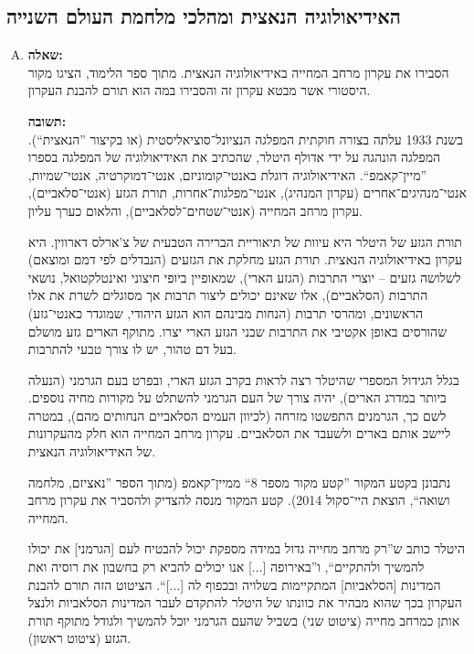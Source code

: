 \documentclass[a4paper]{article}
\newcommand\hl[1]   {#1}
\begin{document}
	\subsection{האידיאולוגיה הנאצית ומהלכי מלחמת העולם השנייה}
		\begin{enumerate}[A.]
			\item \textbf{שאלה: }\\
			הסבירו את עקרון מרחב המחייה באידיאולוגיה הנאצית. מתוך ספר הלימוד, הציגו מקור היסטורי אשר מבטא עקרון זה והסבירו במה הוא תורם להבנת העקרון. 
			
			\textbf{תשובה: }\\			
			בשנת 1933 עלתה בצורה חוקתית המפלגה הנציונל־סוציאליסטית (או בקיצור ''\hl{הנאצית}``). המפלגה הונהגה על ידי \hl{אדולף היטלר}, שהכתיב את האידיאולוגיה של המפלגה בספרו ''מיין־קאמפ``. האידיאולוגיה דוגלת באנטי־קומוניזם, אנטי־דמוקרטיה, אנטי־שמיות, אנטי־מנהיגים־אחרים (עקרון המנהיג), אנטי־מפלגות־אחרות, תורת הגזע (אנטי־סלאביים), עקרון מרחב המחייה (אנטי־שטחים־לסלאביים), והלאום כערך עליון. 
			
			תורת הגזע של היטלר היא עיוות של תיאוריית הברירה הטבעית של צ'ארלס דארווין. היא עקרון באידיאולוגיה הנאצית. תורת הגזע מחלקת את הגזעים (הנבדלים לפי דמם ומוצאם) לשלושה גזעים – יוצרי התרבות (הגזע הארי), שמאופיין ביופי חיצוני ואינטלקטואל, נושאי התרבות (הסלאביים), אלו שאינם יכולים ליצור תרבות אך מסוגלים לשרת את אלו הראשונים, ומהרסי תרבות (הנחות מבינהם הוא הגזע היהודי, שמוגדר כאנטי־גזע) שהורסים באופן אקטיבי את התרבות שבני הגזע הארי יצרו. מתוקף הארים גזע מושלם בעל דם טהור, יש לו צורך טבעי להתרבות. 
			
			בגלל הגידול המספרי שהיטלר רצה לראות בקרב הגזע הארי, ובפרט בעם הגרמני (הנעלה ביותר במדרג הארים), יהיה צורך של העם הגרמני להשתלט על מקורות מחיה נוספים. לשם כך, הגרמנים התפשטו מזרחה (לכיוון העמים הסלאביים הנחותים מהם), במטרה ליישב אותם בארים ולשעבד את הסלאביים. עקרון מרחב המחייה הוא חלק מהעקרונות של האידיאולוגיה הנאצית. 
			
			נתבונן בקטע המקור ''קטע מקור מספר 8`` ממיין־קאמפ (מתוך הספר ''נאציזם, מלחמה ושואה``, הוצאת היי־סקול 2014). קטע המקור מנסה להצדיק ולהסביר את עקרון מרחב המחייה. 
			
			היטלר כותב ש''רק מרחב מחייה גדול במידה מספקת יכול להבטיח לעם [הגרמני] את יכולו להמשיך ולהתקיים``, ו''באירופה [...] אנו יכולים להביא רק בחשבון את רוסיה ואת המדינות [הסלאביות] המתקיימות בשלויה ובכפוף לה [...]``. הציטוט הזה תורם להבנת העקרון בכך שהוא מבהיר את כוונתו של היטלר להתקדם לעבר המדינות הסלאביות ולנצל אותן כמרחב מחייה (ציטוט שני) בשביל שהעם הגרמני יוכל להמשיך ולגודל מתוקף תורת הגזע (ציטוט ראשון). 
			

\end{enumerate}
\end{document}

